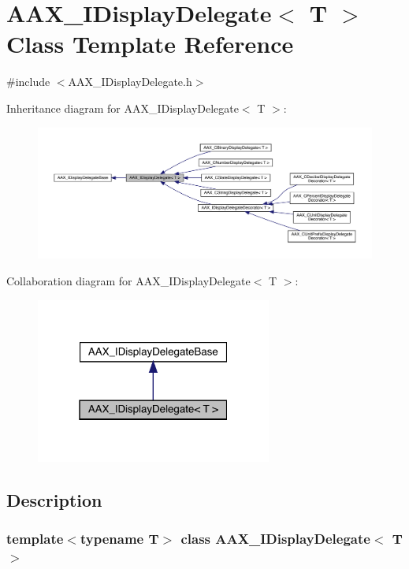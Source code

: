 \hypertarget{a01801}{}\section{A\+A\+X\+\_\+\+I\+Display\+Delegate$<$ T $>$ Class Template Reference}
\label{a01801}


{\ttfamily \#include $<$A\+A\+X\+\_\+\+I\+Display\+Delegate.\+h$>$}



Inheritance diagram for A\+A\+X\+\_\+\+I\+Display\+Delegate$<$ T $>$\+:
\nopagebreak
\begin{figure}[H]
\begin{center}
\leavevmode
\includegraphics[width=350pt]{a01800}
\end{center}
\end{figure}


Collaboration diagram for A\+A\+X\+\_\+\+I\+Display\+Delegate$<$ T $>$\+:
\nopagebreak
\begin{figure}[H]
\begin{center}
\leavevmode
\includegraphics[width=220pt]{a01799}
\end{center}
\end{figure}


\subsection{Description}
\subsubsection*{template$<$typename T$>$\newline
class A\+A\+X\+\_\+\+I\+Display\+Delegate$<$ T $>$}

